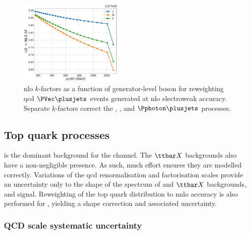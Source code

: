 \begin{figure}[htbp]
    \centering
    \includegraphics[width=0.45\textwidth]{figures/nlo_k_factors/1D_all_ewk.pdf}
    \caption[NLO $k$-factors as a function of generator-level boson \pt for reweighting QCD $\PVec \plusjets$ events generated at LO electroweak accuracy]{\acrshort{nlo} $k$-factors as a function of generator-level boson \pt for reweighting \acrshort{qcd} $\PVec \plusjets$ events generated at \acrshort{nlo} electroweak accuracy. Separate $k$-factors correct the \PW, \PZ, and $\Pphoton\plusjets$ processes.}
    \label{fig:htoinv_nlo_k_factor_ewk}
\end{figure}




\subsection{Top quark processes}
\label{subsec:htoinv_ttbar_uncerts}

\ttbarpjets is the dominant background for the \ttH channel. The $\ttbar X$ backgrounds also have a non-negligible presence. As such, much effort ensures they are modelled correctly. Variations of the \acrshort{qcd} renormalisation and factorisation scales provide an uncertainty only to the shape of the \ptmiss spectrum of \ttbar and $\ttbar X$ backgrounds, and \ttH signal. Reweighting of the top quark \pt distribution to \acrshort{nnlo} accuracy is also performed for \ttbar, yielding a shape correction and associated uncertainty.




\subsubsection{QCD scale systematic uncertainty}
\label{subsubsec:ttbar_renorm_fact_scale_uncert}

